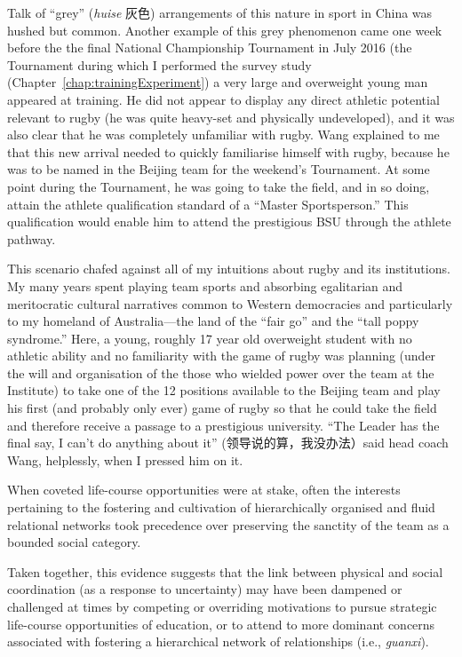 \begin{CJK}{UTF8}{gbsn}
Talk of ``grey'' (\textit{huise} 灰色) arrangements of this nature in sport in China was hushed but common.  Another example of this grey phenomenon came one week before the the final National Championship Tournament in July 2016 (the Tournament during which I performed the survey study (Chapter~\ref{chap:trainingExperiment}) a very large and overweight young man appeared at training.  He did not appear to display any direct athletic potential relevant to rugby (he was quite heavy-set and physically undeveloped), and it was also clear that he was completely unfamiliar with rugby. Wang explained to me that this new arrival needed to quickly familiarise himself with rugby, because he was to be named in the Beijing team for the weekend's Tournament.  At some point during the Tournament, he was going to take the field, and in so doing, attain the athlete qualification standard of a ``Master Sportsperson.''  This qualification would enable him to attend the prestigious BSU through the athlete pathway.

This scenario chafed against all of my intuitions about rugby and its institutions.  My many years spent playing team sports and absorbing egalitarian and meritocratic cultural narratives common to Western democracies and particularly to my homeland of Australia---the land of the ``fair go'' and the ``tall poppy syndrome.''  Here, a young, roughly 17 year old overweight student with no athletic ability and no familiarity with the game of rugby was planning (under the will and organisation of the those who wielded power over the team at the Institute) to take one of the 12 positions available to the Beijing team and play his first (and probably only ever) game of rugby so that he could take the field and therefore receive a passage to a prestigious university.  ``The Leader has the final say, I can't do anything about it'' (领导说的算，我没办法）said head coach Wang, helplessly, when I pressed him on it.

When coveted life-course opportunities were at stake, often the interests pertaining to the fostering and cultivation of hierarchically organised and fluid relational networks took precedence over preserving the sanctity of the team as a bounded social category.

Taken together, this evidence suggests that the link between physical and social coordination (as a response to uncertainty) may have been dampened or challenged at times by competing or overriding motivations to pursue strategic life-course opportunities of education, or to attend to more dominant concerns associated with fostering a hierarchical network of relationships (i.e., \textit{guanxi}).





\end{CJK}
